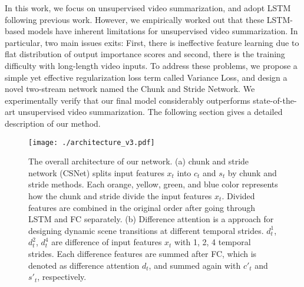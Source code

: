 \documentclass[letterpaper]{article} \usepackage{aaai19}  \usepackage{times}  \usepackage{helvet}  \usepackage{courier}  \usepackage{url}  \usepackage{graphicx}  \frenchspacing  \setlength{\pdfpagewidth}{8.5in}  \setlength{\pdfpageheight}{11in}
\begin{document}
In this work, we focus on unsupervised video summarization, and adopt LSTM following previous work. However, we empirically worked out that these LSTM-based models have inherent limitations for unsupervised video summarization. In particular, two main issues exits: First, there is ineffective feature learning due to flat distribution of output importance scores and second, there is the training difficulty with long-length video inputs. To address these problems, we propose a simple yet effective regularization loss term called Variance Loss, and design a novel two-stream network named the Chunk and Stride Network. We experimentally verify that our final model considerably outperforms state-of-the-art unsupervised video summarization. The following section gives a detailed description of our method.













































\begin{figure*}[t]
\centering
\texttt{[image: ./architecture\_v3.pdf]}
\caption{The overall architecture of our network. (a) chunk and stride network (CSNet) splits input features $x_t$ into $c_t$ and $s_t$ by chunk and stride methods. Each orange, yellow, green, and blue color represents how the chunk and stride divide the input features $x_t$. Divided features are combined in the original order after going through LSTM and FC separately. (b) Difference attention is a approach for designing dynamic scene transitions at different temporal strides. $d^1_t$, $d^2_t$, $d^4_t$ are difference of input features $x_t$ with 1, 2, 4 temporal strides. Each difference features are summed after FC, which is denoted as difference attention $d_t$, and summed again with $c'_t$ and $s'_t$, respectively.}
\label{fig:overview}
\end{figure*}
\end{document}
